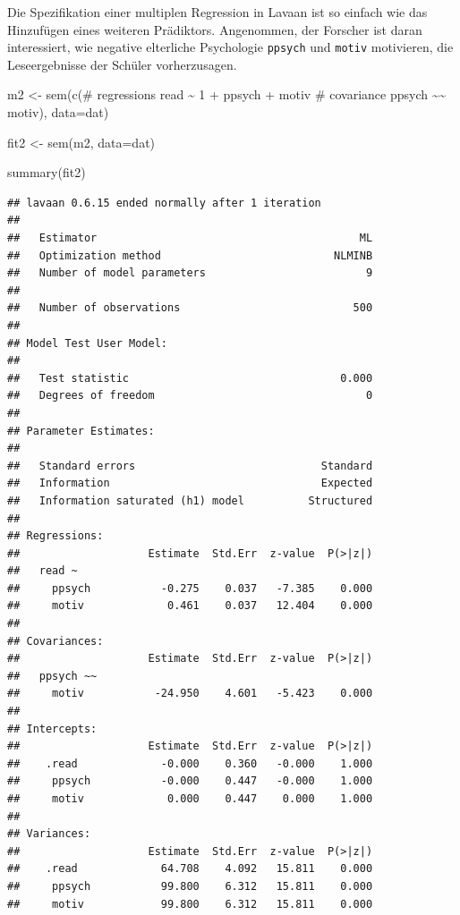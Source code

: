 \documentclass[
]{article}
\newenvironment{Shaded}{\begin{snugshade}}{\end{snugshade}}
\newcommand{\AttributeTok}[1]{\textcolor[rgb]{0.77,0.63,0.00}{#1}}
\newcommand{\FunctionTok}[1]{\textcolor[rgb]{0.00,0.00,0.00}{#1}}
\newcommand{\NormalTok}[1]{#1}
\newcommand{\OtherTok}[1]{\textcolor[rgb]{0.56,0.35,0.01}{#1}}
\newcommand{\StringTok}[1]{\textcolor[rgb]{0.31,0.60,0.02}{#1}}
\begin{document}
Die Spezifikation einer multiplen Regression in Lavaan ist so einfach
wie das Hinzufügen eines weiteren Prädiktors. Angenommen, der Forscher
ist daran interessiert, wie negative elterliche Psychologie
\texttt{ppsych} und \texttt{motiv} motivieren, die Leseergebnisse der
Schüler vorherzusagen.

\begin{Shaded}
\begin{Highlighting}[]
\NormalTok{m2 }\OtherTok{\textless{}{-}} \FunctionTok{sem}\NormalTok{(}\FunctionTok{c}\NormalTok{(}\StringTok{\textquotesingle{}\# regressions}
\StringTok{                read \textasciitilde{} 1 + ppsych + motiv}
\StringTok{                \# covariance}
\StringTok{                ppsych \textasciitilde{}\textasciitilde{} motiv\textquotesingle{}}\NormalTok{), }
             \AttributeTok{data=}\NormalTok{dat)}

\NormalTok{fit2 }\OtherTok{\textless{}{-}} \FunctionTok{sem}\NormalTok{(m2, }\AttributeTok{data=}\NormalTok{dat)}

\FunctionTok{summary}\NormalTok{(fit2)}
\end{Highlighting}
\end{Shaded}

\begin{verbatim}
## lavaan 0.6.15 ended normally after 1 iteration
## 
##   Estimator                                         ML
##   Optimization method                           NLMINB
##   Number of model parameters                         9
## 
##   Number of observations                           500
## 
## Model Test User Model:
##                                                       
##   Test statistic                                 0.000
##   Degrees of freedom                                 0
## 
## Parameter Estimates:
## 
##   Standard errors                             Standard
##   Information                                 Expected
##   Information saturated (h1) model          Structured
## 
## Regressions:
##                    Estimate  Std.Err  z-value  P(>|z|)
##   read ~                                              
##     ppsych           -0.275    0.037   -7.385    0.000
##     motiv             0.461    0.037   12.404    0.000
## 
## Covariances:
##                    Estimate  Std.Err  z-value  P(>|z|)
##   ppsych ~~                                           
##     motiv           -24.950    4.601   -5.423    0.000
## 
## Intercepts:
##                    Estimate  Std.Err  z-value  P(>|z|)
##    .read             -0.000    0.360   -0.000    1.000
##     ppsych           -0.000    0.447   -0.000    1.000
##     motiv             0.000    0.447    0.000    1.000
## 
## Variances:
##                    Estimate  Std.Err  z-value  P(>|z|)
##    .read             64.708    4.092   15.811    0.000
##     ppsych           99.800    6.312   15.811    0.000
##     motiv            99.800    6.312   15.811    0.000
\end{verbatim}
\end{document}
